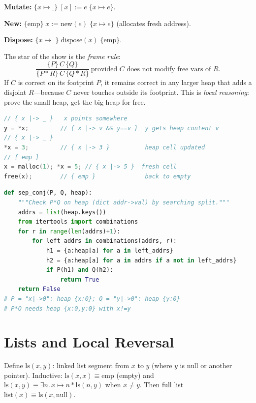 \textbf{Mutate:} $\{x\mapsto\_\}\;[x]:=e\;\{x\mapsto e\}$.

\textbf{New:} $\{\text{emp}\}\;x:=\text{new}(e)\;\{x\mapsto e\}$ (allocates fresh address).

\textbf{Dispose:} $\{x\mapsto\_\}\;\text{dispose}(x)\;\{\text{emp}\}$.

The star of the show is the \emph{frame rule}:
\[
\frac{\{P\}\,C\,\{Q\}}{\{P*R\}\,C\,\{Q*R\}}\ \text{provided }C\text{ does not modify free vars of }R.
\]
If $C$ is correct on its footprint $P$, it remains correct in any larger heap that adds a disjoint $R$—because $C$ never touches outside its footprint. This is \emph{local reasoning}: prove the small heap, get the big heap for free.

\begin{lstlisting}[language=C, caption={Heap axioms in C-like syntax: lookup, mutate, alloc. $*$ keeps footprints disjoint.}, label={lst:heap-axioms}]
// { x |-> _ }   x points somewhere
y = *x;         // { x |-> v && y==v }  y gets heap content v
// { x |-> _ }
*x = 3;         // { x |-> 3 }          heap cell updated
// { emp }
x = malloc(1); *x = 5; // { x |-> 5 }  fresh cell
free(x);        // { emp }              back to empty
\end{lstlisting}

\begin{lstlisting}[language=Python, caption={Modelling $*$ as disjoint dict union: $P*Q$ holds iff heap splits.}, label={lst:star-py}]
def sep_conj(P, Q, heap):
    """Check P*Q on heap (dict addr->val) by searching split."""
    addrs = list(heap.keys())
    from itertools import combinations
    for r in range(len(addrs)+1):
        for left_addrs in combinations(addrs, r):
            h1 = {a:heap[a] for a in left_addrs}
            h2 = {a:heap[a] for a in addrs if a not in left_addrs}
            if P(h1) and Q(h2):
                return True
    return False
# P = "x|->0": heap {x:0}; Q = "y|->0": heap {y:0}
# P*Q needs heap {x:0,y:0} with x!=y
\end{lstlisting}

\section{Lists and Local Reversal}
\label{sec:lists}
Define $\text{ls}(x,y)$: linked list segment from $x$ to $y$ (where $y$ is null or another pointer). Inductive: $\text{ls}(x,x)\equiv\text{emp}$ (empty) and $\text{ls}(x,y)\equiv\exists n.\,x\mapsto n * \text{ls}(n,y)$ when $x\neq y$. Then full list $\text{list}(x)\equiv\text{ls}(x,\text{null})$.

